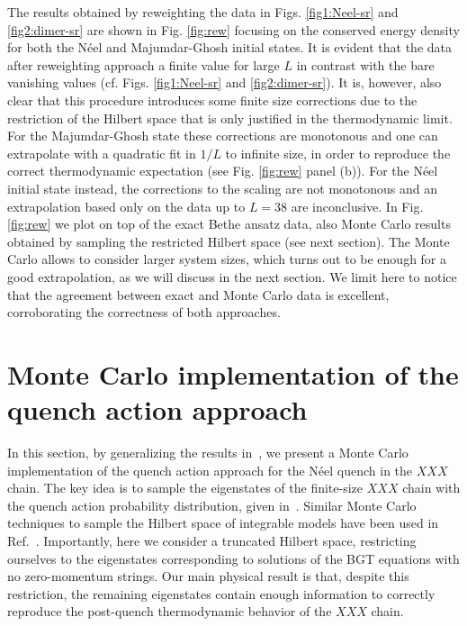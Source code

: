 \documentclass[11pt]{iopart}
\begin{document}
The results obtained by reweighting the data in Figs. \ref{fig1:Neel-sr} and \ref{fig2:dimer-sr}
are shown in Fig. \ref{fig:rew} focusing on the conserved energy density for both the N\'eel and 
Majumdar-Ghosh initial states. 
It is evident that the data after reweighting approach a finite value for large $L$ in contrast with the bare vanishing values 
(cf. Figs.  \ref{fig1:Neel-sr} and \ref{fig2:dimer-sr}). 
It is, however, also clear that this procedure introduces some finite size corrections due to the restriction of the Hilbert space that is 
only justified in the thermodynamic limit. 
%
For the Majumdar-Ghosh state these corrections are monotonous and one can extrapolate with a quadratic fit in $1/L$
to infinite size, in order to reproduce the correct thermodynamic expectation (see Fig. \ref{fig:rew} panel (b)).
%
For the N\'eel initial state instead, the corrections to the scaling are not monotonous and an extrapolation 
based only on the data up to $L=38$ are inconclusive. 
In Fig. \ref{fig:rew} we plot on top of the exact Bethe ansatz data, also Monte Carlo results obtained by sampling the restricted 
Hilbert space (see next section). 
The Monte Carlo allows to consider larger system sizes, which turns out to be enough for a good extrapolation, as we
will discuss in the next section. 
We limit here to notice that the agreement between exact and Monte Carlo data is excellent, corroborating 
the correctness of both approaches.  

\section{Monte Carlo implementation of the quench action approach}
\label{sec6:mcqa}

In this section, by generalizing the results in~\cite{alba-2015}, we present 
a Monte Carlo implementation of the quench action approach for the N\'eel quench in 
the $XXX$ chain. The key idea is to sample the eigenstates of the finite-size $XXX$ 
chain with the quench action probability distribution, given in~. 
Similar Monte Carlo techniques to sample the Hilbert space of integrable models 
have been used in Ref.~\cite{gu-2005,buccheri-2011,faribault-2013}. 
Importantly, here we consider a truncated Hilbert space, restricting ourselves to the 
eigenstates corresponding to solutions of the BGT equations with no zero-momentum 
strings. Our main physical result is that, despite this restriction, the remaining 
eigenstates contain enough information to correctly reproduce the post-quench 
thermodynamic behavior of the $XXX$ chain. 
\end{document}

